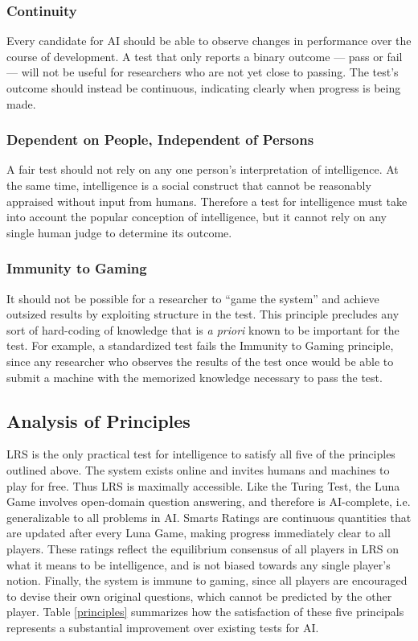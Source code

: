\subsubsection{Continuity}
Every candidate for AI should be able to observe changes in performance over the course of development. A test that only reports a binary outcome --- pass or fail --- will not be useful for researchers who are not yet close to passing. The test's outcome should instead be continuous, indicating clearly when progress is being made.

\subsubsection{Dependent on People, Independent of Persons}
A fair test should not rely on any one person's interpretation of intelligence. At the same time, intelligence is a social construct that cannot be reasonably appraised without input from humans. Therefore a test for intelligence must take into account the popular conception of intelligence, but it cannot rely on any single human judge to determine its outcome.

\subsubsection{Immunity to Gaming}
It should not be possible for a researcher to ``game the system'' and achieve outsized results by exploiting structure in the test. This principle precludes any sort of hard-coding of knowledge that is \textit{a priori} known to be important for the test. For example, a standardized test fails the Immunity to Gaming principle, since any researcher who observes the results of the test once would be able to submit a machine with the memorized knowledge necessary to pass the test. 

\subsection{Analysis of Principles}

LRS is the only practical test for intelligence to satisfy all five of the principles outlined above. The system exists online and invites humans and machines to play for free. Thus LRS is maximally accessible. Like the Turing Test, the Luna Game involves open-domain question answering, and therefore is AI-complete, i.e. generalizable to all problems in AI. Smarts Ratings are continuous quantities that are updated after every Luna Game, making progress immediately clear to all players. These ratings reflect the equilibrium consensus of all players in LRS on what it means to be intelligence, and is not biased towards any single player's notion. Finally, the system is immune to gaming, since all players are encouraged to devise their own original questions, which cannot be predicted by the other player. Table \ref{principles} summarizes how the satisfaction of these five principals represents a substantial improvement over existing tests for AI.

